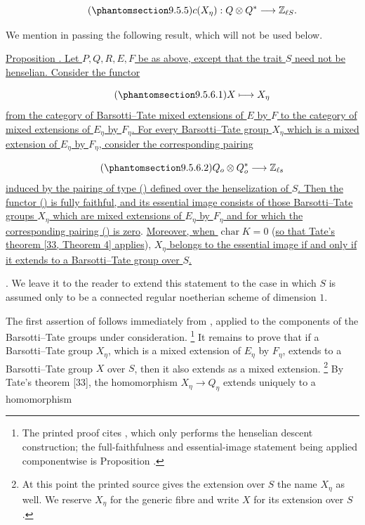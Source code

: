 \begin{equation}\tag{\SGARefTarget{sga7.sga7i.eix.n9-5-5}{9.5.5}}
c(X_\eta):Q\otimes Q^*\longrightarrow\mathbb Z_{\ell S}.
\end{equation}

We mention in passing the following result, which will not be used below.

\medskip
\noindent
\underline{Proposition . Let $P,Q,R,E,F$ be as above, except that the
trait $S$ need not be henselian. Consider the functor}

\begin{equation}\tag{\SGARefTarget{sga7.sga7i.eix.n9-5-6-1}{9.5.6.1}}
X\longmapsto X_\eta
\end{equation}
\underline{from the category of Barsotti--Tate mixed extensions of $E$ by
$F$ to the category of mixed extensions of $E_\eta$ by $F_\eta$. For every
Barsotti--Tate group $X_\eta$ which is a mixed extension of $E_\eta$ by
$F_\eta$, consider the corresponding pairing}

\begin{equation}\tag{\SGARefTarget{sga7.sga7i.eix.n9-5-6-2}{9.5.6.2}}
Q_o\otimes Q_o^*\longrightarrow\mathbb Z_{\ell s}
\end{equation}
\underline{induced by the pairing of type () defined over the
henselization of $S$. Then the functor () is fully faithful, and its
essential image consists of those Barsotti--Tate groups $X_\eta$ which are
mixed extensions of $E_\eta$ by $F_\eta$ and for which the corresponding
pairing () is zero}. \underline{Moreover, when $\operatorname{char}K=0$} (\underline{so that
Tate's theorem [33, Theorem 4] applies}), \underline{$X_\eta$ belongs to the essential
image if and only if it extends to a Barsotti--Tate group over $S$.}

\medskip
\noindent
{}. We leave it to the reader to extend this statement to the case in
which $S$ is assumed only to be a connected regular noetherian scheme of
dimension $1$.

The first assertion of  follows immediately from , applied to the
components of the Barsotti--Tate groups under consideration.
\footnote{The printed proof cites , which only performs the henselian
descent construction; the full-faithfulness and essential-image statement
being applied componentwise is Proposition .}
It remains to prove that if a Barsotti--Tate group $X_\eta$, which is a
mixed extension of $E_\eta$ by $F_\eta$, extends to a Barsotti--Tate group
$X$ over $S$, then it also extends as a mixed extension.
\footnote{At this point the printed source gives the extension over $S$ the
name $X_\eta$ as well. We reserve $X_\eta$ for the generic fibre and write
$X$ for its extension over $S$.}
By Tate's theorem [33], the homomorphism
$X_\eta\longrightarrow Q_\eta$ extends uniquely to a homomorphism

